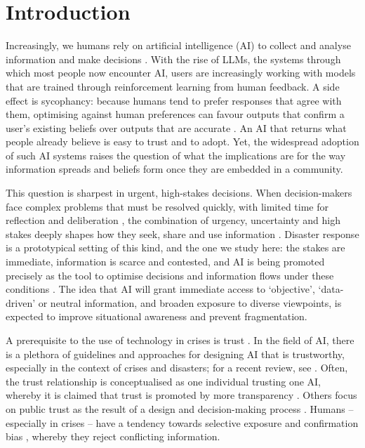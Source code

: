 \documentclass[pdflatex,sn-basic]{sn-jnl}
\begin{document}

\maketitle

\section{Introduction}\label{sec:intro}

Increasingly, we humans rely on artificial intelligence (AI) to collect and analyse information and make decisions \citep{klingbeil2024trust}. With the rise of LLMs, the systems through which most people now encounter AI, users are increasingly working with models that are trained through reinforcement learning from human feedback. A side effect is sycophancy: because humans tend to prefer responses that agree with them, optimising against human preferences can favour outputs that confirm a user's existing beliefs over outputs that are accurate \citep{sharma2023sycophancy, sharma2024generative}. An AI that returns what people already believe is easy to trust and to adopt. Yet, the widespread adoption of such AI systems raises the question of what the implications are for the way information spreads and beliefs form once they are embedded in a community.


This question is sharpest in urgent, high-stakes decisions. When decision-makers face complex problems that must be resolved quickly, with limited time for reflection and deliberation \citep{mendonca2001decision}, the combination of urgency, uncertainty and high stakes deeply shapes how they seek, share and use information \citep{comes2020coordination}. Disaster response is a prototypical setting of this kind, and the one we study here: the stakes are immediate, information is scarce and contested, and AI is being promoted precisely as the tool to optimise decisions and information flows under these conditions \citep{jeon2024hearhere}.
The idea that AI will grant immediate access to `objective', `data-driven' or neutral information, and broaden exposure to diverse viewpoints, is expected to improve situational awareness and prevent fragmentation.

A prerequisite to the use of technology in crises is trust \citep{steinbrink2024transparency}.
In the field of AI, there is a plethora of guidelines and approaches for designing AI that is trustworthy, especially in the context of crises and disasters; for a recent review, see \citet{albahri2024systematic}.
Often, the trust relationship is conceptualised as one individual trusting one AI, whereby it is claimed that trust is promoted by more transparency \citep{visave2025transparency}.
Others focus on public trust as the result of a design and decision-making process \citep{tzachor2020artificial}.
Humans -- especially in crises -- have a tendency towards selective exposure \citep{barbera2015tweeting} and confirmation bias \citep{paulus2024interplay}, whereby they reject conflicting information.
\end{document}
